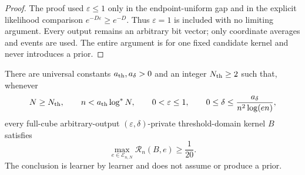\begin{proof}
The proof used \(\varepsilon\le 1\) only in the endpoint-uniform gap and in the explicit likelihood comparison \(e^{-D \varepsilon}\ge e^{-D}\). Thus \(\varepsilon=1\) is included with no limiting argument. Every output remains an arbitrary bit vector; only coordinate averages and events are used. The entire argument is for one fixed candidate kernel and never introduces a prior.

\end{proof}

\begin{proposition}
\label{prop:step-004-result}
There are universal constants $a_{\rm th},a_\delta>0$ and an integer
$N_{\rm th}\geq2$ such that, whenever
\[
N\geq N_{\rm th},\qquad n<a_{\rm th}\log^*N,\qquad
0<\varepsilon\leq1,\qquad
0\leq\delta\leq\frac{a_\delta}{n^2\log(en)},
\]
every full-cube arbitrary-output $(\varepsilon,\delta)$-private
threshold-domain kernel $B$ satisfies
\[
\max_{e\in\mathcal E_{n,N}}\mathcal R_n(B,e)\geq\frac1{20}.
\]
The conclusion is learner by learner and does not assume or produce a
prior.
\end{proposition}
